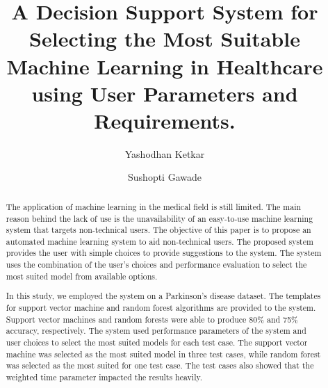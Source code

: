 \documentclass[a4paper,fleqn]{cas-dc}
\begin{document}
\let\WriteBookmarks\relax
\def\floatpagepagefraction{1}
\def\textpagefraction{.001}



\title [mode = title]{A Decision Support System for Selecting the Most Suitable Machine Learning in Healthcare using User Parameters and Requirements.}

\let\printorcid\relax

\author[1]{Yashodhan Ketkar}

\author[2]{Sushopti Gawade}

\begin{abstract}
    The application of machine learning in the medical field is still limited. The main reason behind the lack of use is the unavailability of an easy-to-use machine learning system that targets non-technical users. The objective of this paper is to propose an automated machine learning system to aid non-technical users. The proposed system provides the user with simple choices to provide suggestions to the system. The system uses the combination of the user's choices and performance evaluation to select the most suited model from available options.
    
    In this study, we employed the system on a Parkinson's disease dataset. The templates for support vector machine and random forest algorithms are provided to the system. Support vector machines and random forests were able to produce 80\% and 75\% accuracy, respectively. The system used performance parameters of the system and user choices to select the most suited models for each test case. The support vector machine was selected as the most suited model in three test cases, while random forest was selected as the most suited for one test case. The test cases also showed that the weighted time parameter impacted the results heavily.
\end{abstract}
\end{document}

